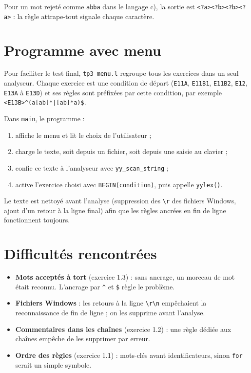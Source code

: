 \documentclass[11pt,a4paper]{article}
\begin{document}
Pour un mot rejeté comme \texttt{abba} dans le langage c), la sortie est \texttt{<?a><?b><?b><?a>} :
la règle attrape-tout signale chaque caractère.

\section{Programme avec menu}

Pour faciliter le test final, \texttt{tp3\_menu.l} regroupe tous les exercices dans un seul
analyseur. Chaque exercice est une condition de départ (\texttt{E11A}, \texttt{E11B1},
\texttt{E11B2}, \texttt{E12}, \texttt{E13A} à \texttt{E13D}) et ses règles sont préfixées par
cette condition, par exemple \verb!<E13B>^(a[ab]*|[ab]*a)$!.

Dans \texttt{main}, le programme :
\begin{enumerate}[leftmargin=1.5em]
  \item affiche le menu et lit le choix de l'utilisateur ;
  \item charge le texte, soit depuis un fichier, soit depuis une saisie au clavier ;
  \item confie ce texte à l'analyseur avec \verb!yy_scan_string! ;
  \item active l'exercice choisi avec \verb!BEGIN(condition)!, puis appelle \verb!yylex()!.
\end{enumerate}

Le texte est nettoyé avant l'analyse (suppression des \texttt{\textbackslash r} des fichiers Windows,
ajout d'un retour à la ligne final) afin que les règles ancrées en fin de ligne fonctionnent
toujours.

\section{Difficultés rencontrées}

\begin{itemize}[leftmargin=1.5em]
  \item \textbf{Mots acceptés à tort} (exercice 1.3) : sans ancrage, un morceau de mot était reconnu. L'ancrage par \texttt{\textasciicircum} et \texttt{\$} règle le problème.
  \item \textbf{Fichiers Windows} : les retours à la ligne \texttt{\textbackslash r\textbackslash n} empêchaient la reconnaissance de fin de ligne ; on les supprime avant l'analyse.
  \item \textbf{Commentaires dans les chaînes} (exercice 1.2) : une règle dédiée aux chaînes empêche de les supprimer par erreur.
  \item \textbf{Ordre des règles} (exercice 1.1) : mots-clés avant identificateurs, sinon \texttt{for} serait un simple symbole.
\end{itemize}
\end{document}
